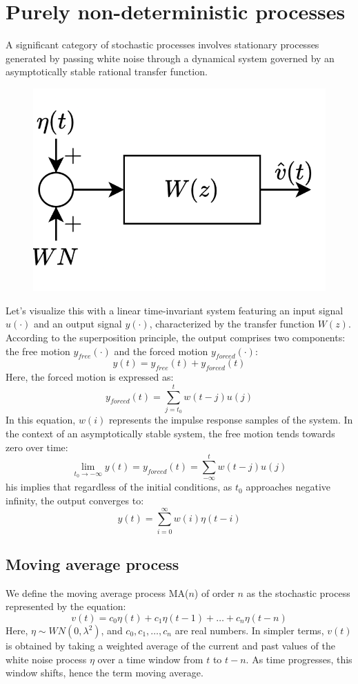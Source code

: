 \section{Purely non-deterministic processes}

A significant category of stochastic processes involves stationary processes generated by passing white noise through a dynamical system governed by an asymptotically stable rational transfer function.
\begin{figure}[H]
    \centering
    \includegraphics[width=0.3\linewidth]{images/ndet.png} 
\end{figure}
Let's visualize this with a linear time-invariant system featuring an input signal $u(\cdot)$ and an output signal $y(\cdot)$, characterized by the transfer function $W(z)$. 
According to the superposition principle, the output comprises two components: the free motion $y_{free}(\cdot)$ and the forced motion $y_{forced}(\cdot)$: 
\[y(t)=y_{free}(t)+y_{forced}(t)\]
Here, the forced motion is expressed as:
\[y_{forced}(t)=\sum_{j=t_0}^{t}w(t-j)u(j)\]
In this equation, $w(i)$ represents the impulse response samples of the system.
In the context of an asymptotically stable system, the free motion tends towards zero over time:
\[\lim_{t_0 \rightarrow -\infty}y(t)=y_{forced}(t)=\sum_{-\infty}^t w(t-j)u(j)\]
his implies that regardless of the initial conditions, as $t_0$ approaches negative infinity, the output converges to:
\[y(t)=\sum_{i=0}^{\infty}w(i)\eta(t-i)\]

\subsection{Moving average process}
We define the moving average process MA($n$) of order $n$ as the stochastic process represented by the equation:
\[v(t) = c_0\eta(t) + c_1\eta(t-1) + \dots + c_n\eta(t-n)\]
Here, $\eta \sim WN(0, \lambda^2)$, and  $c_0, c_1,\dots, c_n$ are real numbers.
In simpler terms, $v(t)$ is obtained by taking a weighted average of the current and past values of the white noise process $\eta$ over a time window from $t$ to $t-n$.
As time progresses, this window shifts, hence the term moving average.

